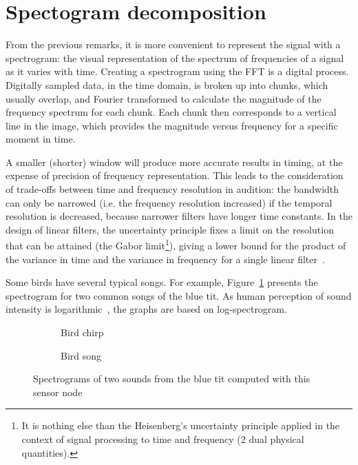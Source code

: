 \documentclass{EPL-master-thesis-covers-EN}
\begin{document}
\section{Spectogram decomposition}

From the previous remarks, it is more convenient to represent the signal with a spectrogram: the visual representation of the spectrum of frequencies of a signal as it varies with time. Creating a spectrogram using the FFT is a digital process. Digitally sampled data, in the time domain, is broken up into chunks, which usually overlap, and Fourier transformed to calculate the magnitude of the frequency spectrum for each chunk. Each chunk then corresponds to a vertical line in the image, which provides the magnitude versus frequency for a specific moment in time.

A smaller (shorter) window will produce more accurate results in timing, at the expense of precision of frequency representation.
This leads to the consideration of trade-offs between time
and frequency resolution in audition: the bandwidth can only be narrowed (i.e. the frequency resolution increased) if the temporal resolution is decreased, because narrower filters have longer time constants.
In the design of linear filters, the uncertainty principle fixes a
limit on the resolution that can be attained (the Gabor limit\footnote{It is nothing else than the Heisenberg's uncertainty principle applied in the context of signal processing to time and frequency (2 dual physical quantities).}),
giving a lower bound for the product of the variance in time
and the variance in frequency for a single linear filter~\cite{Stowell}.

Some birds have several typical songs. For example, Figure~\ref{fig:blue_tit} presents the spectrogram for two common songs of the blue tit. As human perception of sound intensity is logarithmic~\cite{Psychoacoustics}, the graphs are based on log-spectrogram.

\begin{figure}[H]
\begin{subfigure}{.48\textwidth}
  \centering
  
  \caption{Bird chirp}
\end{subfigure}
\begin{subfigure}{.48\textwidth}
  \centering
  
  \caption{Bird song}
\end{subfigure}
\caption{Spectrograms of two sounds from the blue tit computed with this sensor node}
\label{fig:blue_tit}
\end{figure}
\end{document}
